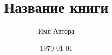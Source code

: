\documentclass[a4paper,12pt]{book} %
\begin{document}
\frontmatter %
\title{Название книги}
\author{Имя Автора}
\date{\today}
\maketitle

\tableofcontents %

\mainmatter %



\end{document}
